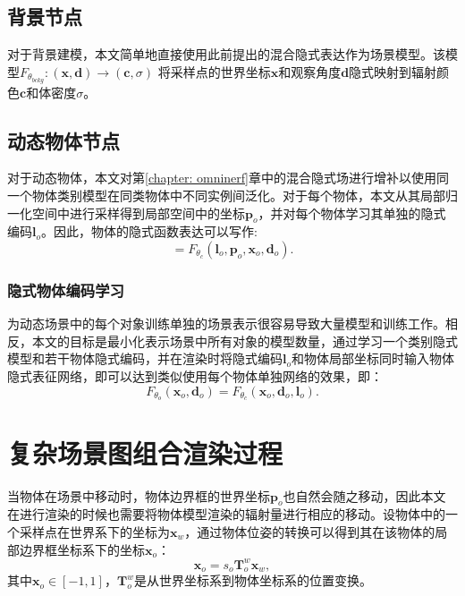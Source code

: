 \newcommand{\bgweight}{{\theta_{bckg}}}
\newcommand{\bgmodel}{F_{\bgweight}}
\newcommand{\classweight}{{\theta_{c}}}
\newcommand{\classmodel}{F_{\classweight}}
\newcommand{\xbf}{{\mathbf{x}}}
\newcommand{\dbf}{{\mathbf{d}}}
\newcommand{\cbf}{{\mathbf{c}}}
\newcommand{\po}{{\mathbf{p}_o}}
\newcommand{\latent}{{\mathbf{l}_o}}
\newcommand{\xo}{{\xbf_o}}
\newcommand{\dobj}{{\dbf_o}}
\newcommand{\xw}{{\xbf_w}}
\newcommand{\objpose}{\mathbf{T}_o^w}
\newcommand{\campose}{\mathbf{T}_c^w}
\newcommand{\ray}{{\mathbf{r}}}
\newcommand{\tobj}{{t_{o}}}
\newcommand{\tino}{{t_{o, in}}}
\newcommand{\touto}{{t_{o, out}}}
\newcommand{\tinw}{{t_{w, in}}}
\newcommand{\toutw}{{t_{w, out}}}

\subsection{背景节点}
对于背景建模，本文简单地直接使用此前提出的混合隐式表达作为场景模型。该模型$\bgmodel: (\xbf, \dbf) \to (\cbf, \sigma)$
将采样点的世界坐标$\xbf$和观察角度$\dbf$隐式映射到辐射颜色$\cbf$和体密度$\sigma$。

\subsection{动态物体节点}
对于动态物体，本文对第\ref{chapter: omninerf}章中的混合隐式场进行增补以使用同一个物体类别模型在同类物体中不同实例间泛化。对于每个物体，本文从其局部归一化空间中进行采样得到局部空间中的坐标$\po$，并对每个物体学习其单独的隐式编码$\latent$。因此，物体的隐式函数表达可以写作:
\begin{equation}
[\cbf(\xo), \sigma(\xo)] = \classmodel(\latent, \po, \xo, \dobj).
\end{equation}

\subsubsection{隐式物体编码学习}
为动态场景中的每个对象训练单独的场景表示很容易导致大量模型和训练工作。相反，本文的目标是最小化表示场景中所有对象的模型数量，通过学习一个类别隐式模型和若干物体隐式编码，并在渲染时将隐式编码$\latent$和物体局部坐标同时输入物体隐式表征网络，即可以达到类似使用每个物体单独网络的效果，即：
\begin{equation}
    F_{\theta_o}(\xo, \dobj) = \classmodel(\xo, \dobj, \latent).
\end{equation}

\section{复杂场景图组合渲染过程}
当物体在场景中移动时，物体边界框的世界坐标$\po$也自然会随之移动，因此本文在进行渲染的时候也需要将物体模型渲染的辐射量进行相应的移动。设物体中的一个采样点在世界系下的坐标为$\xw$，通过物体位姿的转换可以得到其在该物体的局部边界框坐标系下的坐标$\xo$：
\begin{equation}
    \xo = s_o\objpose\xw,
\end{equation}
其中$\xo\in[-1,1]$，$\objpose$是从世界坐标系到物体坐标系的位置变换。

